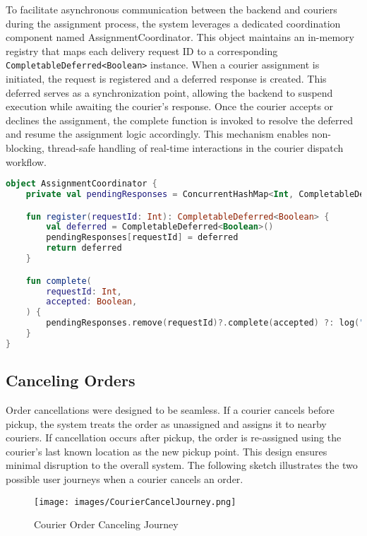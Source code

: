 To facilitate asynchronous communication between the backend and couriers during the assignment process, the system leverages a dedicated coordination component named AssignmentCoordinator. This object maintains an in-memory registry that maps each delivery request ID to a corresponding \texttt{CompletableDeferred<Boolean>} instance. When a courier assignment is initiated, the request is registered and a deferred response is created. This deferred serves as a synchronization point, allowing the backend to suspend execution while awaiting the courier’s response. Once the courier accepts or declines the assignment, the complete function is invoked to resolve the deferred and resume the assignment logic accordingly. This mechanism enables non-blocking, thread-safe handling of real-time interactions in the courier dispatch workflow.

\vspace{5mm}

\begin{lstlisting}[language=Kotlin, caption={Assignment Coordination}]
object AssignmentCoordinator {
    private val pendingResponses = ConcurrentHashMap<Int, CompletableDeferred<Boolean>>()

    fun register(requestId: Int): CompletableDeferred<Boolean> {
        val deferred = CompletableDeferred<Boolean>()
        pendingResponses[requestId] = deferred
        return deferred
    }

    fun complete(
        requestId: Int,
        accepted: Boolean,
    ) {
        pendingResponses.remove(requestId)?.complete(accepted) ?: log("Already completed or missing")
    }
}
\end{lstlisting}

\newpage

\subsection{Canceling Orders}

Order cancellations were designed to be seamless. If a courier cancels before pickup, the system treats the order as unassigned and assigns it to nearby couriers. If cancellation occurs after pickup, the order is re-assigned using the courier’s last known location as the new pickup point. This design ensures minimal disruption to the overall system.
The following sketch illustrates the two possible user journeys when a courier cancels an order.

\begin{figure}[H]
    \centering
    \texttt{[image: images/CourierCancelJourney.png]}
    \caption{Courier Order Canceling Journey}
\end{figure}

